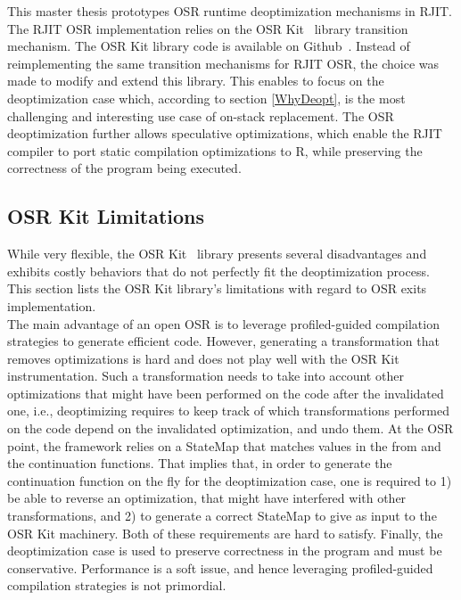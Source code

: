 This master thesis prototypes OSR runtime deoptimization mechanisms in RJIT.
The RJIT OSR implementation relies on the OSR Kit~\cite{OSRKit} library transition mechanism.
The OSR Kit library code is available on Github~\cite{OSRKitGit}.
Instead of reimplementing the same transition mechanisms for RJIT OSR, the choice was made to modify and extend this library.
This enables to focus on the deoptimization case which, according to section \ref{WhyDeopt}, is the most challenging and interesting use case of on-stack replacement.
The OSR deoptimization further allows speculative optimizations, which enable the RJIT compiler to port static compilation optimizations to R, while preserving the correctness of the program being executed.\\

\subsection{OSR Kit Limitations}\label{osrkitlimitations}

While very flexible, the OSR Kit~\cite{OSRKit} library presents several disadvantages and exhibits costly behaviors that do not perfectly fit the deoptimization process.
This section lists the OSR Kit library's limitations with regard to OSR exits implementation.\\

The main advantage of an open OSR is to leverage profiled-guided compilation strategies to generate efficient code.
However, generating a transformation that removes optimizations is hard and does not play well with the OSR Kit instrumentation.
Such a transformation needs to take into account other optimizations that might have been performed on the code after the invalidated one, i.e., deoptimizing requires to keep track of which transformations performed on the code depend on the invalidated optimization, and undo them.
At the OSR point, the framework relies on a StateMap that matches values in the from and the continuation functions.
That implies that, in order to generate the continuation function on the fly for the deoptimization case, one is required to 1) be able to reverse an optimization, that might have interfered with other transformations, and 2) to generate a correct StateMap to give as input to the OSR Kit machinery.
Both of these requirements are hard to satisfy.
Finally, the deoptimization case is used to preserve correctness in the program and must be conservative. 
Performance is a soft issue, and hence leveraging profiled-guided compilation strategies is not primordial.\\

